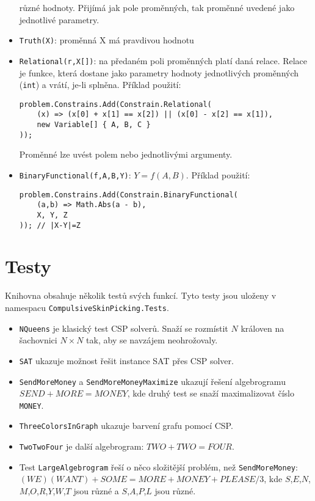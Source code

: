\documentclass[a4paper]{article}
\begin{document}
\begin{itemize}
	různé hodnoty. Přijímá jak pole proměnných, tak proměnné uvedené jako
	jednotlivé parametry.
\item
	\texttt{Truth(X)}: proměnná X má pravdivou hodnotu
\item
	\texttt{Relational(r,X[])}: na předaném poli proměnných platí daná
	relace. Relace je funkce, která dostane jako parametry hodnoty
	jednotlivých proměnných (\texttt{int}) a vrátí, je-li splněna.
	Příklad použití:
\begin{lstlisting}
problem.Constrains.Add(Constrain.Relational(
	(x) => (x[0] + x[1] == x[2]) || (x[0] - x[2] == x[1]),
	new Variable[] { A, B, C }
));
\end{lstlisting}
	Proměnné lze uvést polem nebo jednotlivými argumenty.
\item
	\texttt{BinaryFunctional(f,A,B,Y)}: $Y=f(A,B)$. Příklad použití:
\begin{lstlisting}
problem.Constrains.Add(Constrain.BinaryFunctional(
	(a,b) => Math.Abs(a - b),
	X, Y, Z
)); // |X-Y|=Z
\end{lstlisting}
\end{itemize}

\section{Testy}

Knihovna obsahuje několik testů svých funkcí.
Tyto testy jsou uloženy v namespacu \texttt{CompulsiveSkinPicking.Tests}.

\begin{itemize}
\item
	\texttt{NQueens} je klasický test CSP solverů. Snaží se rozmístit $N$
	královen na šachovnici $N\times N$ tak, aby se navzájem neohrožovaly.
\item
	\texttt{SAT} ukazuje možnost řešit instance SAT přes CSP solver.
\item
	\texttt{SendMoreMoney} a \texttt{SendMoreMoneyMaximize} ukazují řešení
	algebrogramu $SEND+MORE=MONEY$, kde druhý test se snaží maximalizovat
	číslo \texttt{MONEY}.
\item
	\texttt{ThreeColorsInGraph} ukazuje barvení grafu pomocí CSP.
\item
	\texttt{TwoTwoFour} je další algebrogram: $TWO+TWO=FOUR$.
\item
	Test \texttt{LargeAlgebrogram} řeší o něco složitější problém, než
	\texttt{SendMoreMoney}: $(WE)(WANT)+SOME=MORE+MONEY+PLEASE/3$,
	kde $S$,$E$,$N$,$M$,$O$,$R$,$Y$,$W$,$T$ jsou různé a $S$,$A$,$P$,$L$
	jsou různé.
\end{itemize}
\end{document}

